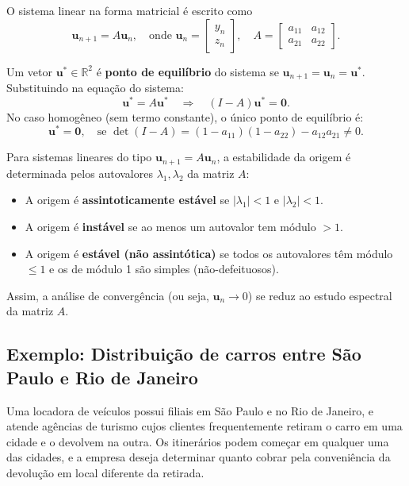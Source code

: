 \documentclass{article}
\begin{document}
O  sistema linear na forma matricial é escrito como 
\[
  \mathbf{u}_{n+1} = A \mathbf{u}_n, \quad \text{onde } \mathbf{u}_n
  = \begin{bmatrix} y_n \\ z_n \end{bmatrix},\quad A = \begin{bmatrix}
    a_{11} & a_{12} \\ a_{21} & a_{22} \end{bmatrix}.
\]

Um vetor \( \mathbf{u}^* \in \mathbb{R}^2 \) é \textbf{ponto de
  equilíbrio} do sistema se
\( \mathbf{u}_{n+1} = \mathbf{u}_n = \mathbf{u}^* \).  Substituindo na
equação do sistema:
\[
\mathbf{u}^* = A \mathbf{u}^* \quad \Rightarrow \quad (I - A) \mathbf{u}^* = \mathbf{0}.
\]
No caso homogêneo (sem termo constante), o único ponto de equilíbrio é:
\[
\mathbf{u}^* = \mathbf{0}, \quad \text{se } \det(I - A) =  (1 - a_{11})(1 - a_{22}) - a_{12} a_{21} \neq 0.
\]

Para sistemas lineares do tipo \( \mathbf{u}_{n+1} = A \mathbf{u}_n \),
a estabilidade da origem é determinada pelos autovalores
\( \lambda_1, \lambda_2 \) da matriz \( A \):

\begin{itemize}
\item A origem é \textbf{assintoticamente estável} se
  \( |\lambda_1| < 1 \) e \( |\lambda_2| < 1 \).
  \item A origem é \textbf{instável} se ao menos um autovalor tem módulo \( > 1 \).
  \item A origem é \textbf{estável (não assintótica)} se todos os
    autovalores têm módulo \( \leq 1 \) e os de módulo 1 são simples
    (não-defeituosos).
\end{itemize}

Assim, a análise de convergência (ou seja, \( \mathbf{u}_n \to 0 \)) se
reduz ao estudo espectral da matriz \( A \).



\subsection{Exemplo: Distribuição de carros entre São Paulo e Rio de Janeiro}



Uma locadora de veículos possui filiais em São Paulo e no Rio de
Janeiro, e atende agências de turismo cujos clientes frequentemente
retiram o carro em uma cidade e o devolvem na outra. Os itinerários
podem começar em qualquer uma das cidades, e a empresa deseja
determinar quanto cobrar pela conveniência da devolução em local
diferente da retirada.
\end{document}
